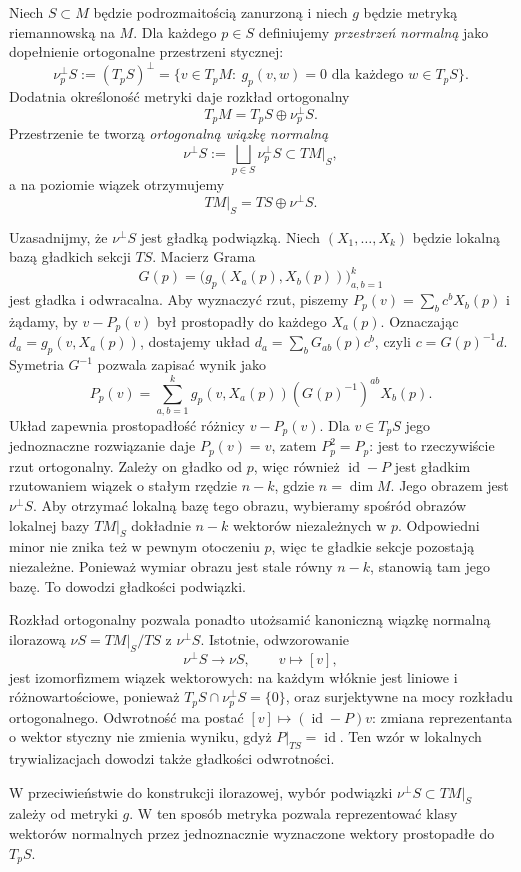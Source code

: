 \begin{uwaga}
Niech $S\subset M$ będzie podrozmaitością zanurzoną i niech
$g$ będzie metryką riemannowską na $M$. Dla każdego $p\in S$
definiujemy \emph{przestrzeń normalną} jako dopełnienie
ortogonalne przestrzeni stycznej:
\[
\nu_p^\perp S:=(T_pS)^\perp
=\{v\in T_pM:\ g_p(v,w)=0
\text{ dla każdego }w\in T_pS\}.
\]
Dodatnia określoność metryki daje rozkład ortogonalny
\[
T_pM=T_pS\oplus\nu_p^\perp S.
\]
Przestrzenie te tworzą \emph{ortogonalną wiązkę normalną}
\[
\nu^\perp S:=\bigsqcup_{p\in S}\nu_p^\perp S
\subset TM|_S,
\]
a na poziomie wiązek otrzymujemy
\[
TM|_S=TS\oplus\nu^\perp S.
\]

Uzasadnijmy, że $\nu^\perp S$ jest gładką podwiązką.
Niech $(X_1,\ldots,X_k)$ będzie lokalną bazą gładkich
sekcji $TS$. Macierz Grama
\[
G(p)=\bigl(g_p(X_a(p),X_b(p))\bigr)_{a,b=1}^k
\]
jest gładka i odwracalna. Aby wyznaczyć rzut, piszemy
$P_p(v)=\sum_b c^bX_b(p)$ i żądamy, by
$v-P_p(v)$ był prostopadły do każdego $X_a(p)$.
Oznaczając $d_a=g_p(v,X_a(p))$, dostajemy układ
$d_a=\sum_bG_{ab}(p)c^b$, czyli $c=G(p)^{-1}d$.
Symetria $G^{-1}$ pozwala zapisać wynik jako
\[
P_p(v)=
\sum_{a,b=1}^k
g_p(v,X_a(p))(G(p)^{-1})^{ab}X_b(p).
\]
Układ zapewnia prostopadłość różnicy $v-P_p(v)$.
Dla $v\in T_pS$ jego jednoznaczne rozwiązanie daje
$P_p(v)=v$, zatem $P_p^2=P_p$: jest to rzeczywiście rzut
ortogonalny. Zależy on gładko od $p$, więc również
$\operatorname{id}-P$ jest gładkim rzutowaniem
wiązek o stałym rzędzie $n-k$, gdzie $n=\dim M$.
Jego obrazem jest $\nu^\perp S$. Aby otrzymać lokalną
bazę tego obrazu, wybieramy spośród obrazów lokalnej
bazy $TM|_S$ dokładnie $n-k$ wektorów niezależnych w $p$.
Odpowiedni minor nie znika też w pewnym otoczeniu $p$,
więc te gładkie sekcje pozostają niezależne.
Ponieważ wymiar obrazu jest stale równy $n-k$,
stanowią tam jego bazę. To dowodzi gładkości podwiązki.

Rozkład ortogonalny pozwala ponadto utożsamić
kanoniczną wiązkę normalną ilorazową
$\nu S=TM|_S/TS$ z $\nu^\perp S$.
Istotnie, odwzorowanie
\[
\nu^\perp S\longrightarrow\nu S,
\qquad
v\longmapsto[v],
\]
jest izomorfizmem wiązek wektorowych: na każdym
włóknie jest liniowe i różnowartościowe, ponieważ
$T_pS\cap\nu_p^\perp S=\{0\}$, oraz surjektywne
na mocy rozkładu ortogonalnego. Odwrotność ma postać
$[v]\mapsto(\operatorname{id}-P)v$: zmiana reprezentanta
o wektor styczny nie zmienia wyniku, gdyż
$P|_{TS}=\operatorname{id}$. Ten wzór w lokalnych
trywializacjach dowodzi także gładkości odwrotności.

W przeciwieństwie do konstrukcji ilorazowej,
wybór podwiązki $\nu^\perp S\subset TM|_S$
zależy od metryki $g$. W ten sposób metryka
pozwala reprezentować klasy wektorów normalnych
przez jednoznacznie wyznaczone wektory prostopadłe
do $T_pS$.
\end{uwaga}


